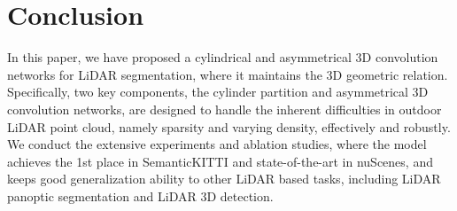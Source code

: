 \documentclass[final]{cvpr}
\begin{document}
 
\section{Conclusion}

In this paper, we have proposed a cylindrical and asymmetrical 3D convolution networks for LiDAR segmentation, where it maintains the 3D geometric relation. Specifically, two key components, the cylinder partition and asymmetrical 3D convolution networks, are designed to handle the inherent difficulties in outdoor LiDAR point cloud, namely sparsity and varying density, effectively and robustly.
We conduct the extensive experiments and ablation studies, where the model achieves the {{1st place}} in SemanticKITTI and state-of-the-art in nuScenes, and keeps good generalization ability to other LiDAR based tasks, including LiDAR panoptic segmentation and LiDAR 3D detection.
 
	










{\small


}
\end{document}
